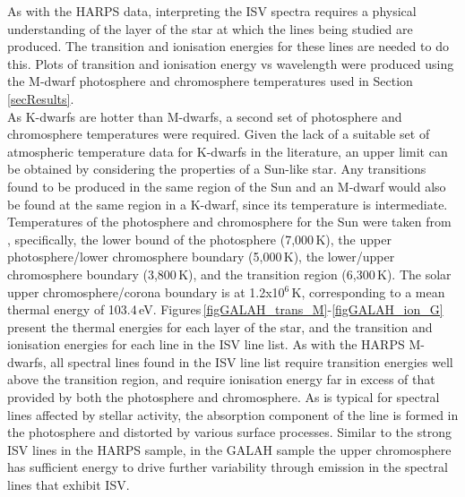 As with the HARPS data, interpreting the ISV spectra requires a physical understanding of the layer of the star at which the lines being studied are produced. The transition and ionisation energies for these lines are needed to do this. Plots of transition and ionisation energy vs wavelength were produced using the M-dwarf photosphere and chromosphere temperatures used in Section\,\ref{secResults}.\\

As K-dwarfs are hotter than M-dwarfs, a second set of photosphere and chromosphere temperatures were required. Given the lack of a suitable set of atmospheric temperature data for K-dwarfs in the literature, an upper limit can be obtained by considering the properties of a Sun-like star. Any transitions found to be produced in the same region of the Sun and an M-dwarf would also be found at the same region in a K-dwarf, since its temperature is intermediate. Temperatures of the photosphere and chromosphere for the Sun were taken from \citet{2017Linsky}, specifically, the lower bound of the photosphere (7,000\,K), the upper photosphere/lower chromosphere boundary (5,000\,K), the lower/upper chromosphere boundary (3,800\,K), and the transition region (6,300\,K). The solar upper chromosphere/corona boundary is at 1.2x10$^{6}$\,K, corresponding to a mean thermal energy of 103.4\,eV. Figures\,\ref{figGALAH_trans_M}-\ref{figGALAH_ion_G} present the thermal energies for each layer of the star, and the transition and ionisation energies for each line in the ISV line list. As with the HARPS M-dwarfs, all spectral lines found in the ISV line list require transition energies well above the transition region, and require ionisation energy far in excess of that provided by both the photosphere and chromosphere. As is typical for spectral lines affected by stellar activity, the absorption component of the line is formed in the photosphere and distorted by various surface processes. Similar to the strong ISV lines in the HARPS sample, in the GALAH sample the upper chromosphere has sufficient energy to drive further variability through emission in the spectral lines that exhibit ISV.\\

